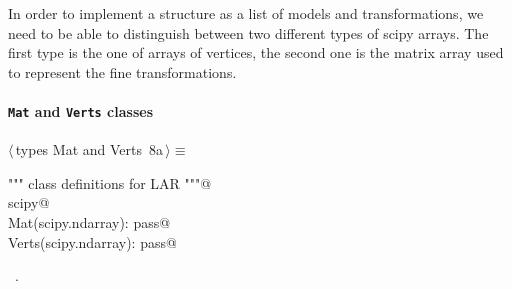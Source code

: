 \documentclass[11pt,oneside]{article}	%
\begin{document}
In order to implement a structure as a list of models and transformations, we need to be able to distinguish between two different types of scipy arrays. The first type is the one of arrays of vertices, the second one is the matrix array used to represent the fine transformations.

\paragraph{\texttt{Mat} and \texttt{Verts} classes}
\begin{flushleft} \small \label{scrap23}
\protect{}$\langle\,$types Mat and Verts\nobreak\ {\footnotesize 8a}$\,\rangle\equiv$
\vspace{-1ex}
\begin{list}{}{} \item
\mbox{}\verb@""" class definitions for LAR """@\\
\mbox{}\verb@import scipy@\\
\mbox{}\verb@class Mat(scipy.ndarray): pass@\\
\mbox{}\verb@class Verts(scipy.ndarray): pass@\\
\mbox{}\verb@@{\NWsep}
\end{list}
\vspace{-1ex}
\footnotesize\addtolength{\baselineskip}{-1ex}
\begin{list}{}{\setlength{\itemsep}{-\parsep}\setlength{\itemindent}{-\leftmargin}}
\item \NWtxtMacroRefIn\ .
\end{list}
\end{flushleft}
\end{document}
